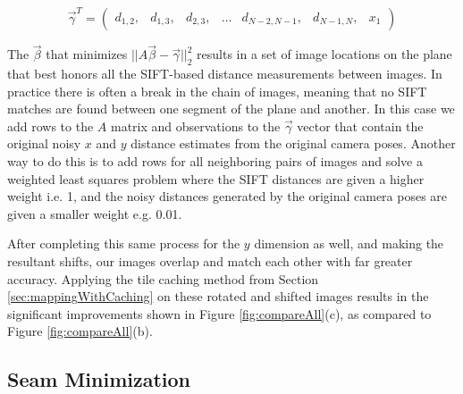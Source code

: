 \message{ !name(oldpaper.tex)}\documentclass[10pt,twocolumn,letterpaper]{article}
\begin{document}
\[
\vec{\gamma}^T =
\begin{pmatrix}
  d_{1,2}, &d_{1,3}, &d_{2,3}, &\hdots &d_{N-2,N-1}, &d_{N-1,N}, &x_1
\end{pmatrix}
\]

The $\vec{\beta}$ that minimizes $||A \vec{\beta} -
\vec{\gamma}||_2^2$ results in a set of image locations on the plane
that best honors all the SIFT-based distance measurements between
images. In practice there is often a break in the chain of images,
meaning that no SIFT matches are found between one segment of the
plane and another. In this case we add rows to the $A$ matrix and
observations to the $\vec{\gamma}$ vector that contain the original
noisy $x$ and $y$ distance estimates from the original camera
poses. Another way to do this is to add rows for all neighboring pairs
of images and solve a weighted least squares problem where the SIFT
distances are given a higher weight i.e. 1, and the noisy distances
generated by the original camera poses \cite{chen2010indoor,
  liu2010indoor} are given a smaller weight e.g. 0.01.

After completing this same process for the $y$ dimension as well, and
making the resultant shifts, our images overlap and match each other
with far greater accuracy. Applying the tile caching method from
Section \ref{sec:mappingWithCaching} on these rotated and shifted
images results in the significant improvements shown in Figure
\ref{fig:compareAll}(c), as compared to Figure
\ref{fig:compareAll}(b).


\subsection{Seam Minimization}
\label{sec:seamMinimization}
\end{document}
